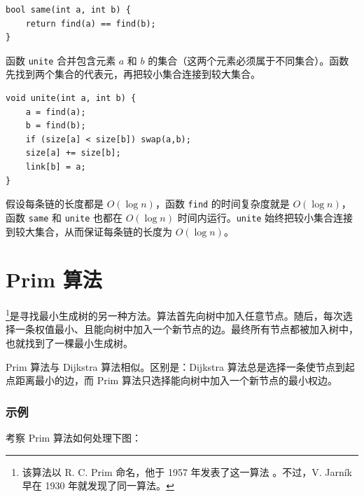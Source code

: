 \begin{lstlisting}
bool same(int a, int b) {
    return find(a) == find(b);
}
\end{lstlisting}

\begin{samepage}
函数 \texttt{unite} 合并包含元素 $a$ 和 $b$ 的集合（这两个元素必须属于不同集合）。函数先找到两个集合的代表元，再把较小集合连接到较大集合。

\begin{lstlisting}
void unite(int a, int b) {
    a = find(a);
    b = find(b);
    if (size[a] < size[b]) swap(a,b);
    size[a] += size[b];
    link[b] = a;
}
\end{lstlisting}
\end{samepage}

假设每条链的长度都是 $O(\log n)$，函数 \texttt{find} 的时间复杂度就是 $O(\log n)$，函数 \texttt{same} 和 \texttt{unite} 也都在 $O(\log n)$ 时间内运行。\texttt{unite} 始终把较小集合连接到较大集合，从而保证每条链的长度为 $O(\log n)$。

\section{Prim 算法}


\footnote{该算法以 R. C. Prim 命名，他于 1957 年发表了这一算法 \cite{pri57}。不过，V. Jarník 早在 1930 年就发现了同一算法。}是寻找最小生成树的另一种方法。算法首先向树中加入任意节点。随后，每次选择一条权值最小、且能向树中加入一个新节点的边。最终所有节点都被加入树中，也就找到了一棵最小生成树。

Prim 算法与 Dijkstra 算法相似。区别是：Dijkstra 算法总是选择一条使节点到起点距离最小的边，而 Prim 算法只选择能向树中加入一个新节点的最小权边。

\subsubsection{示例}

考察 Prim 算法如何处理下图：

